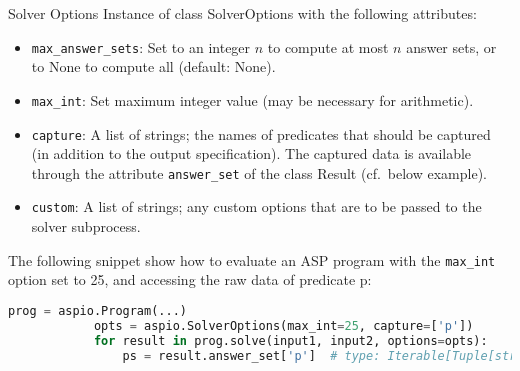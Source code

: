 \documentclass[%
beamer,%
english,%
10pt,%
]{beamer}
\newcommand{\blue}[1]{{\color{blue}#1}}
\begin{document}
\begin{frame}[fragile]{Solver Options}
    Instance of class \blue{SolverOptions} with the following attributes:
    \begin{itemize}
        \item \blue{\lstinline{max_answer_sets}}:
            Set to an integer $n$ to compute at most $n$ answer sets,
            or to \blue{None} to compute all (default: None).
        \item \blue{\lstinline{max_int}}:
            Set maximum integer value (may be necessary for arithmetic).
        \item \blue{\lstinline{capture}}:
            A list of strings; the names of predicates that should be captured
            (in addition to the output specification).
            The captured data is available through the attribute \blue{\lstinline{answer_set}} of the class \blue{Result} (cf.~below example).
        \item \blue{\lstinline{custom}}:
            A list of strings; any custom options that are to be passed to the solver subprocess.
    \end{itemize}
    \begin{example}%
        The following snippet show how to evaluate an ASP program with the \lstinline{max_int} option set to 25,
        and accessing the raw data of predicate p:
        \begin{lstlisting}[basicstyle=\footnotesize,language=python,autogobble]
            prog = aspio.Program(...)
            opts = aspio.SolverOptions(max_int=25, capture=['p'])
            for result in prog.solve(input1, input2, options=opts):
                ps = result.answer_set['p']  # type: Iterable[Tuple[str, ...]]
        \end{lstlisting}
    \end{example}
\end{frame}
\end{document}
